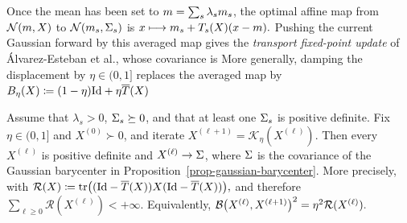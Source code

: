 Once the mean has been set to $m=\sum_s\lambda_sm_s$, the optimal affine map from $\mathcal{N}(m,X)$ to $\mathcal{N}(m_s,\Sigma_s)$ is \(x\longmapsto m_s+T_s(X)(x-m).\)
Pushing the current Gaussian forward by this averaged map gives the \emph{transport fixed-point update} of \'Alvarez-Esteban et al., whose covariance is
More generally, damping the displacement by $\eta\in(0,1]$ replaces the averaged map by \(B_\eta(X) \coloneqq (1-\eta)\mathrm{Id}+\eta\overline T(X)\)
\begin{prop}\label{prop-gaussian-barycenter-fixed-point-convergence}
Assume that $\lambda_s>0$, $\Sigma_s\succeq0$, and that at least one $\Sigma_s$ is positive definite. Fix $\eta\in(0,1]$ and $X^{(0)}\succ0$, and iterate
\(X^{(\ell+1)}=\mathcal K_\eta(X^{(\ell)}).\)
Then every $X^{(\ell)}$ is positive definite and $X^{(\ell)}\to\Sigma$, where $\Sigma$ is the covariance of the Gaussian barycenter in Proposition~\ref{prop-gaussian-barycenter}. More precisely, with
\(\mathcal R(X) \coloneqq \operatorname{tr}\bigl((\mathrm{Id}-\overline T(X))X(\mathrm{Id}-\overline T(X))\bigr),\)
and therefore $\sum_{\ell\geq0}\mathcal R(X^{(\ell)})<+\infty$. Equivalently, \(\mathcal{B}\bigl(X^{(\ell)},X^{(\ell+1)}\bigr)^2 = \eta^2\mathcal R(X^{(\ell)}).\)
\end{prop}

